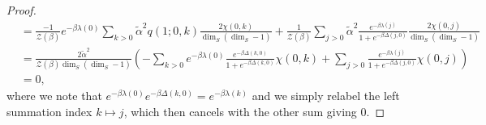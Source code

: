 \documentclass{article}
\newcommand{\partfun}{\mathcal{Z}}
\begin{document}
\begin{proof}
\begin{align}
    &= \frac{-1}{\partfun(\beta)} e^{-\beta \lambda(0)} \sum_{k > 0} \widetilde{\alpha}^2 q(1; 0, k) \frac{2 \chi(0, k)}{\dim_S(\dim_S - 1)} + \frac{1}{\partfun(\beta)} \sum_{j > 0} \widetilde{\alpha}^2 \frac{e^{-\beta \lambda(j)} }{1 + e^{-\beta \Delta(j, 0)}} \frac{2 \chi(0,j)}{\dim_S (\dim_S - 1)}\nonumber \\
    &= \frac{2 \widetilde{\alpha}^2}{\partfun(\beta) \dim_S(\dim_S - 1)} \left(-\sum_{k > 0} e^{-\beta \lambda(0)} \frac{e^{-\beta \Delta(k, 0)}}{1 + e^{-\beta \Delta(k,0)}} \chi(0, k) + \sum_{j > 0} \frac{e^{-\beta \lambda(j)}}{1 + e^{-\beta \Delta(j, 0)}} \chi(0, j) \right) \nonumber\\
    &= 0,\label{eq:onResTerm}
\end{align}
where we note that $e^{-\beta \lambda(0)} e^{-\beta \Delta(k, 0)} = e^{-\beta \lambda(k)}$ and we simply relabel the left summation index $k \mapsto j$, which then cancels with the other sum giving 0.


\end{proof}
\end{document}
